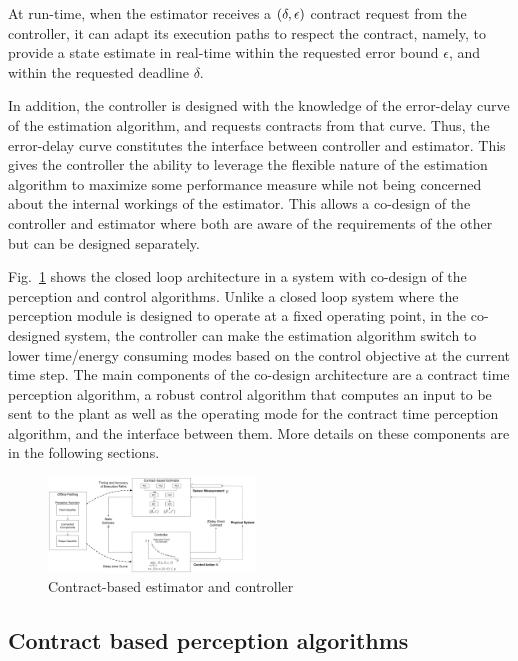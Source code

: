 At run-time, when the estimator receives a $(\delta,\epsilon)$ contract request from the controller, it can adapt its execution paths to respect the contract, namely, to provide a state estimate in real-time within the requested error bound $\epsilon$, and within the requested deadline $\delta$.

In addition, the controller is designed with the knowledge of the error-delay curve of the estimation algorithm, and requests contracts from that curve.
Thus, the error-delay curve constitutes the interface between controller and estimator.
This gives the controller the ability to leverage the flexible nature of the estimation algorithm to maximize some performance measure while not being concerned about the internal workings of the estimator.
This allows a co-design of the controller and estimator where both are aware of the requirements of the other but can be designed separately.

Fig.~\ref{fig:fullcodesignedCE} shows the closed loop architecture in a system with co-design of the perception and control algorithms.
Unlike a closed loop system where the perception module is designed to operate at a fixed operating point, in the co-designed system, the controller can make the estimation algorithm switch to lower time/energy consuming modes based on the control objective at the current time step.
The main components of the co-design architecture are a contract time perception algorithm, a robust control algorithm that computes an input to be sent to the plant as well as the operating mode for the contract time perception algorithm, and the interface between them. More details on these components are in the following sections.

\begin{figure}[t]
	\centering
	\includegraphics[width=0.49\textwidth]{figures/omnigraffle_figures/process_figure2}
	\caption{Contract-based estimator and controller}
	\label{fig:fullcodesignedCE}
\end{figure}
\subsection{Contract based perception algorithms}

